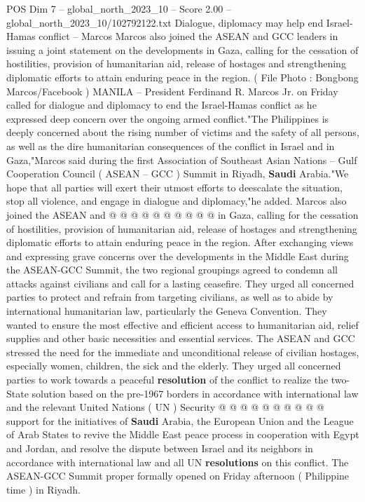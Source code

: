\begin{textsample}{POS Dim 7 – global\_north\_2023\_10 – Score 2.00 – global\_north\_2023\_10/102792122.txt}  \label{ex:f7_pos_429}
Dialogue, diplomacy may help end Israel-Hamas conflict -- Marcos Marcos also joined the ASEAN and GCC leaders in issuing a joint statement on the developments in Gaza, calling for the cessation of hostilities, provision of humanitarian aid, release of hostages and strengthening diplomatic efforts to attain enduring peace in the region. ( File Photo : Bongbong Marcos/Facebook ) MANILA -- President Ferdinand R.
Marcos Jr. on Friday called for dialogue and diplomacy to end the Israel-Hamas conflict as he expressed deep concern over the ongoing armed conflict."The Philippines is deeply concerned about the rising number of victims and the safety of all persons, as well as the dire humanitarian consequences of the conflict in Israel and in Gaza,"Marcos said during the first Association of Southeast Asian Nations -- Gulf Cooperation Council ( ASEAN -- GCC ) Summit in Riyadh, \textbf{Saudi} Arabia."We hope that all parties will exert their utmost efforts to deescalate the situation, stop all violence, and engage in dialogue and diplomacy,"he added.
Marcos also joined the ASEAN and @ @ @ @ @ @ @ @ @ @ in Gaza, calling for the cessation of hostilities, provision of humanitarian aid, release of hostages and strengthening diplomatic efforts to attain enduring peace in the region.
After exchanging views and expressing grave concerns over the developments in the Middle East during the ASEAN-GCC Summit, the two regional groupings agreed to condemn all attacks against civilians and call for a lasting ceasefire.
They urged all concerned parties to protect and refrain from targeting civilians, as well as to abide by international humanitarian law, particularly the Geneva Convention.
They wanted to ensure the most effective and efficient access to humanitarian aid, relief supplies and other basic necessities and essential services.
The ASEAN and GCC stressed the need for the immediate and unconditional release of civilian hostages, especially women, children, the sick and the elderly.
They urged all concerned parties to work towards a peaceful \textbf{resolution} of the conflict to realize the two-State solution based on the pre-1967 borders in accordance with international law and the relevant United Nations ( UN ) Security @ @ @ @ @ @ @ @ @ @ support for the initiatives of \textbf{Saudi} Arabia, the European Union and the League of Arab States to revive the Middle East peace process in cooperation with Egypt and Jordan, and resolve the dispute between Israel and its neighbors in accordance with international law and all UN \textbf{resolutions} on this conflict.
The ASEAN-GCC Summit proper formally opened on Friday afternoon ( Philippine time ) in Riyadh.

\end{textsample}
